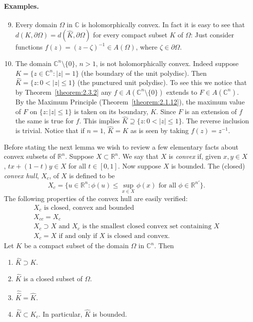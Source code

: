 \paragraph*{Examples.}
\begin{enumerate}\setcounter{enumi}{8}
\item Every domain $\Omega$ in $\mathbb C$ is holomorphically convex. In fact it is easy to see that $d(K,\partial\Omega)=d(\widehat K,\partial\Omega)$ for every compact subset $K$ of $\Omega$: Just consider functions $f(z)=(z-\zeta)^{-1}\in A(\Omega)$, where $\zeta\in\partial\Omega$.
\item The domain $\mathbb C^n\setminus\{0\}$, $n>1$, is not holomorphically convex. Indeed suppose $K=\{z\in\mathbb C^n:|z|=1\}$ (the boundary of the unit polydisc). Then $\widehat K=\{z:0<|z|\leq1\}$ (the punctured unit polydisc). To see this we notice that by Theorem~\ref{theorem:2.3.2} any $f\in A(\mathbb C^n\setminus\{0\})$ extends to $F\in A(\mathbb C^n)$. By the Maximum Principle (Theorem~\ref{theorem:2.1.12}), the maximum value of $F$ on $\{z:|z|\leq1\}$ is taken on its boundary, $K$. Since $F$ is an extension of $f$ the same is true for $f$. This implies $\widehat K\supseteq\{z:0<|z|\leq1\}$. The reverse inclusion is trivial. Notice that if $n=1$, $\widehat K=K$ as is seen by taking $f(z)=z^{-1}$.
\end{enumerate}
Before stating the next lemma we wish to review a few elementary facts about convex subsets of $\mathbb R^n$. Suppose $X\subset\mathbb R^n$. We say that $X$ is \emph{convex} if, given $x,y\in X$, $tx+(1-t)y\in X$ for all $t\in[0,1]$. Now suppose $X$ is bounded. The (closed) \emph{convex hull}, $X_c$, of $X$ is defined to be
\[X_c=\{u\in\mathbb R^n:\phi(u)\leq\sup_{x\in X}\phi(x)\text{ for all }\phi\in\mathbb R^{n\prime}\}.\]
The following properties of the convex hull are easily verified:
\begin{gather*}
X_c\text{ is closed, convex and bounded}\\
X_{cc}=X_c\\
X_c\supset X\text{ and }X_c\text{ is the smallest closed convex set containing }X\\
X_c=X\text{ if and only if }X\text{ is closed and convex.}
\end{gather*}
 Let $K$ be a compact subset of the domain $\Omega$ in $\mathbb C^n$. Then
\begin{enumerate}
\item $\widehat K\supset K$.
\item $\widehat K$ is a closed subset of $\Omega$.
\item $\widehat{\widehat K}=\widehat K$.
\item $\widehat K\subset K_c$. In particular, $\widehat K$ is bounded.
\end{enumerate}
